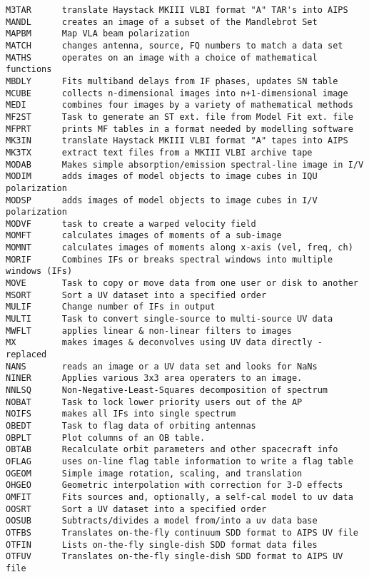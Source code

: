 \begin{verbatim}
M3TAR      translate Haystack MKIII VLBI format "A" TAR's into AIPS
MANDL      creates an image of a subset of the Mandlebrot Set
MAPBM      Map VLA beam polarization
MATCH      changes antenna, source, FQ numbers to match a data set
MATHS      operates on an image with a choice of mathematical functions
MBDLY      Fits multiband delays from IF phases, updates SN table
MCUBE      collects n-dimensional images into n+1-dimensional image
MEDI       combines four images by a variety of mathematical methods
MF2ST      Task to generate an ST ext. file from Model Fit ext. file
MFPRT      prints MF tables in a format needed by modelling software
MK3IN      translate Haystack MKIII VLBI format "A" tapes into AIPS
MK3TX      extract text files from a MKIII VLBI archive tape
MODAB      Makes simple absorption/emission spectral-line image in I/V
MODIM      adds images of model objects to image cubes in IQU polarization
MODSP      adds images of model objects to image cubes in I/V polarization
MODVF      task to create a warped velocity field
MOMFT      calculates images of moments of a sub-image
MOMNT      calculates images of moments along x-axis (vel, freq, ch)
MORIF      Combines IFs or breaks spectral windows into multiple windows (IFs)
MOVE       Task to copy or move data from one user or disk to another
MSORT      Sort a UV dataset into a specified order
MULIF      Change number of IFs in output
MULTI      Task to convert single-source to multi-source UV data
MWFLT      applies linear & non-linear filters to images
MX         makes images & deconvolves using UV data directly - replaced
NANS       reads an image or a UV data set and looks for NaNs
NINER      Applies various 3x3 area operaters to an image.
NNLSQ      Non-Negative-Least-Squares decomposition of spectrum
NOBAT      Task to lock lower priority users out of the AP
NOIFS      makes all IFs into single spectrum
OBEDT      Task to flag data of orbiting antennas
OBPLT      Plot columns of an OB table.
OBTAB      Recalculate orbit parameters and other spacecraft info
OFLAG      uses on-line flag table information to write a flag table
OGEOM      Simple image rotation, scaling, and translation
OHGEO      Geometric interpolation with correction for 3-D effects
OMFIT      Fits sources and, optionally, a self-cal model to uv data
OOSRT      Sort a UV dataset into a specified order
OOSUB      Subtracts/divides a model from/into a uv data base
OTFBS      Translates on-the-fly continuum SDD format to AIPS UV file
OTFIN      Lists on-the-fly single-dish SDD format data files
OTFUV      Translates on-the-fly single-dish SDD format to AIPS UV file

\end{verbatim}
